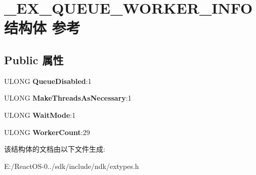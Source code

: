 \hypertarget{struct___e_x___q_u_e_u_e___w_o_r_k_e_r___i_n_f_o}{}\section{\+\_\+\+E\+X\+\_\+\+Q\+U\+E\+U\+E\+\_\+\+W\+O\+R\+K\+E\+R\+\_\+\+I\+N\+F\+O结构体 参考}
\label{struct___e_x___q_u_e_u_e___w_o_r_k_e_r___i_n_f_o}
\subsection*{Public 属性}
\begin{DoxyCompactItemize}
\item 
\mbox{\label{struct___e_x___q_u_e_u_e___w_o_r_k_e_r___i_n_f_o_a10fa292e6614af29c275062a62313524}} 
U\+L\+O\+NG {\bfseries Queue\+Disabled}\+:1
\item 
\mbox{\label{struct___e_x___q_u_e_u_e___w_o_r_k_e_r___i_n_f_o_a6bd27796612bb90eece1482fa15d3bf2}} 
U\+L\+O\+NG {\bfseries Make\+Threads\+As\+Necessary}\+:1
\item 
\mbox{\label{struct___e_x___q_u_e_u_e___w_o_r_k_e_r___i_n_f_o_a0e2ca26916d090c48d8ba0e548733d42}} 
U\+L\+O\+NG {\bfseries Wait\+Mode}\+:1
\item 
\mbox{\label{struct___e_x___q_u_e_u_e___w_o_r_k_e_r___i_n_f_o_a56a63efc68eb7bd6f908c1d25bf0c10e}} 
U\+L\+O\+NG {\bfseries Worker\+Count}\+:29
\end{DoxyCompactItemize}


该结构体的文档由以下文件生成\+:\begin{DoxyCompactItemize}
\item 
E\+:/\+React\+O\+S-\/0../sdk/include/ndk/extypes.\+h\end{DoxyCompactItemize}
